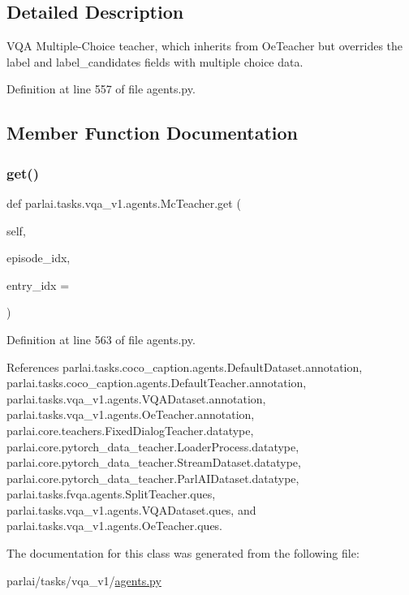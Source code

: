 \subsection{Detailed Description}
\begin{DoxyVerb}VQA Multiple-Choice teacher, which inherits from OeTeacher but overrides
the label and label_candidates fields with multiple choice data.
\end{DoxyVerb}
 

Definition at line 557 of file agents.\+py.



\subsection{Member Function Documentation}
\mbox{\label{classparlai_1_1tasks_1_1vqa__v1_1_1agents_1_1McTeacher_acfe24f89d048cb6e8ccd745838223f07}} 
\subsubsection{\texorpdfstring{get()}{get()}}
{\footnotesize\ttfamily def parlai.\+tasks.\+vqa\+\_\+v1.\+agents.\+Mc\+Teacher.\+get (\begin{DoxyParamCaption}\item[{}]{self,  }\item[{}]{episode\+\_\+idx,  }\item[{}]{entry\+\_\+idx = {} }\end{DoxyParamCaption})}



Definition at line 563 of file agents.\+py.



References parlai.\+tasks.\+coco\+\_\+caption.\+agents.\+Default\+Dataset.\+annotation, parlai.\+tasks.\+coco\+\_\+caption.\+agents.\+Default\+Teacher.\+annotation, parlai.\+tasks.\+vqa\+\_\+v1.\+agents.\+V\+Q\+A\+Dataset.\+annotation, parlai.\+tasks.\+vqa\+\_\+v1.\+agents.\+Oe\+Teacher.\+annotation, parlai.\+core.\+teachers.\+Fixed\+Dialog\+Teacher.\+datatype, parlai.\+core.\+pytorch\+\_\+data\+\_\+teacher.\+Loader\+Process.\+datatype, parlai.\+core.\+pytorch\+\_\+data\+\_\+teacher.\+Stream\+Dataset.\+datatype, parlai.\+core.\+pytorch\+\_\+data\+\_\+teacher.\+Parl\+A\+I\+Dataset.\+datatype, parlai.\+tasks.\+fvqa.\+agents.\+Split\+Teacher.\+ques, parlai.\+tasks.\+vqa\+\_\+v1.\+agents.\+V\+Q\+A\+Dataset.\+ques, and parlai.\+tasks.\+vqa\+\_\+v1.\+agents.\+Oe\+Teacher.\+ques.



The documentation for this class was generated from the following file\+:\begin{DoxyCompactItemize}
\item 
parlai/tasks/vqa\+\_\+v1/\hyperlink{parlai_2tasks_2vqa__v1_2agents_8py}{agents.\+py}\end{DoxyCompactItemize}

